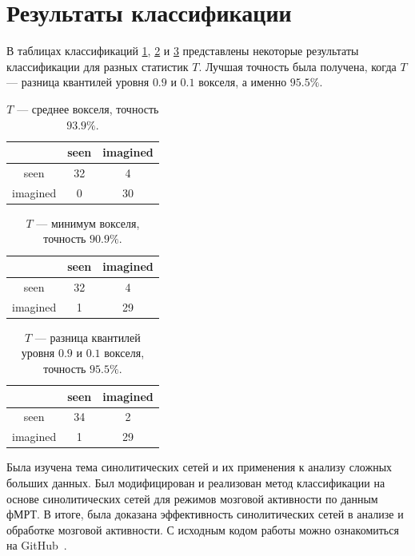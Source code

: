 \documentclass[specialist,
substylefile = spbu_report.rtx,
subf,href,colorlinks=true, 12pt]{disser}
\begin{document}
		\section{Результаты классификации}
			В таблицах классификаций \ref{tb:2}, \ref{tb:3} и \ref{tb:4} представлены некоторые результаты классификации для разных статистик $T$. Лучшая точность была получена, когда $T$ --- разница квантилей уровня $0.9$ и $0.1$ вокселя, а именно $95.5\%$.
						
			\begin{table}[H]				
				\centering			
				\begin{tabular}{c|cc}
					& \multicolumn{1}{c|}{seen} & imagined \\ \hline
					seen     & 32                        & 4        \\ \cline{1-1}
					imagined & 0                         & 30      
				\end{tabular}
				\caption{\label{tb:2}$T$ --- среднее вокселя, точность $93.9\%$.}
			\end{table}			
			{
			\begin{table}[H]
				\centering				
				\begin{tabular}{c|cc}
					& \multicolumn{1}{c|}{seen} & imagined \\ \hline
					seen     & 32                        & 4        \\ \cline{1-1}
					imagined & 1                         & 29      
				\end{tabular}
				\caption{\label{tb:3}$T$ --- минимум вокселя, точность $90.9\%$.}
			\end{table}
			
			\begin{table}[H]
				\centering
				\begin{tabular}{c|cc}
					& \multicolumn{1}{c|}{seen} & imagined \\ \hline
					seen     & 34                        & 2        \\ \cline{1-1}
					imagined & 1                         & 29      
				\end{tabular}
				\caption{\label{tb:4}$T$ --- разница квантилей уровня $0.9$ и $0.1$ вокселя, точность $95.5\%$.}
			\end{table}
			}
	\conclusion
		Была изучена тема синолитических сетей и их применения к анализу сложных больших данных. Был модифицирован и реализован метод классификации на основе синолитических сетей для режимов мозговой активности по данным фМРТ. В итоге, была доказана эффективность синолитических сетей в анализе и обработке мозговой активности. С исходным кодом работы можно ознакомиться на GitHub~\cite{Vlasrnko2023}.
	   
	
	
	
	
	
\end{document}
